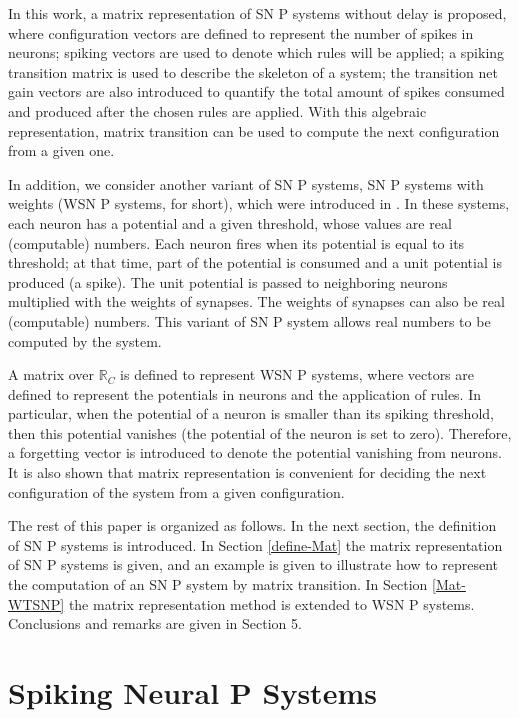 \documentclass[runningheads]{llncs}
\begin{document}
In this work, a matrix representation of SN P systems without delay
is proposed, where configuration vectors are defined to represent
the number of spikes in neurons; spiking vectors are used to denote
which rules will be applied; a spiking transition matrix is used to
describe the skeleton of a system; the transition net gain vectors are
also introduced to quantify the total amount of spikes consumed and
produced after the chosen rules are applied. With this algebraic
representation, matrix transition can be used to compute the next
configuration from a given one.

In addition, we consider another variant of SN P systems, SN P
systems with weights (WSN P systems, for short), which were
introduced in \cite{WSNP}. In these systems, each neuron has a
potential and a given threshold, whose values are real (computable)
numbers. Each neuron fires when its potential is equal to its
threshold; at that time, part of the potential is consumed and a
unit potential is produced (a spike). The unit potential is passed
to neighboring neurons multiplied with the weights of synapses. The
weights of synapses can also be real (computable) numbers. This
variant of SN P system allows real numbers to be computed by the
system.

A matrix over $\mathbb R_C$ is defined to represent WSN P systems,
where vectors are defined to represent the potentials in neurons and
the application of rules. In particular, when the potential of a
neuron is smaller than its spiking threshold, then this potential
vanishes (the potential of the neuron is set to zero). Therefore, a
forgetting vector is introduced to denote the potential vanishing
from neurons. It is also shown that matrix representation is
convenient for deciding the next configuration of the system from a
given configuration.

The rest of this paper is organized as follows. In the next section,
the definition of SN P systems is introduced. In Section
\ref{define-Mat} the matrix representation of SN P systems is given,
and an example is given to illustrate how to represent the
computation of an SN P system by matrix transition. In Section
\ref{Mat-WTSNP} the matrix representation method is extended to WSN
P systems. Conclusions and remarks are given in Section 5.

\section{Spiking Neural P Systems}\label{definiton-SNP}
\end{document}
